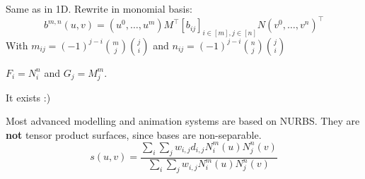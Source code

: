 \begin{definition}
  Same as in 1D. Rewrite in monomial basis:
  \[b^{m, n}(u, v) = (u^0, \ldots, u^m)M^\top[b_{ij}]_{i\in[m], j\in[n]}N (v^0, \ldots, v^n)^\top\]
  With \(m_{ij} = (-1)^{j - i} \binom{m}{j}\binom{j}{i}\) and \(n_{ij} = (-1)^{j - i} \binom{n}{j}\binom{j}{i}\)
\end{definition}

\begin{definition}
  \(F_i = N_i^n\) and \(G_j = M_j^m\).
\end{definition}

\begin{algorithm}
  It exists :)
\end{algorithm}

\begin{definition}
  Most advanced modelling and animation systems are based on NURBS. They are \textbf{not} tensor product surfaces, since bases are non-separable.
  \[s(u,v) = \frac{\sum_i \sum_j w_{i, j} d_{i, j}N_i^m(u)N_j^n(v)}{\sum_i \sum_j w_{i, j}N_i^m(u)N_j^n(v)}\]
\end{definition}
